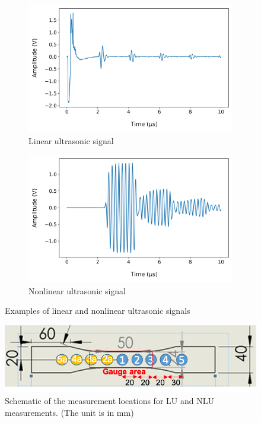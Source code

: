 \begin{figure}[tb]
  \centering
  \begin{subfigure}[t]{0.49\linewidth}
    \includegraphics[width=\textwidth]{fig/lu_signal_raw.png}
    \caption{Linear ultrasonic signal}
    \label{fig: lu signal raw}
  \end{subfigure}
  \begin{subfigure}[t]{0.49\linewidth}
    \includegraphics[width=\textwidth]{fig/nlu_singal_raw.png}
    \caption{Nonlinear ultrasonic signal}
    \label{fig: nlu signal raw}
  \end{subfigure}

  \caption{Examples of linear and nonlinear ultrasonic signals}
  \label{fig: lu and nlu signals raw}
\end{figure}

\begin{figure}[tb]
  \centering
  \includegraphics[width=0.6\linewidth]{fig/specimen_measurment_locs.png}
  \caption{Schematic of the measurement locations for LU and NLU measurements. (The unit is in mm)}
  \label{fig: measurement locations}
\end{figure}

